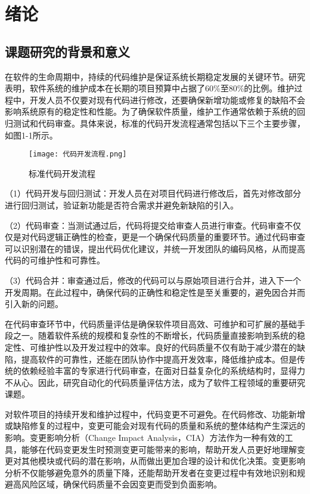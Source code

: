 
\chapter{绪论}

\section{课题研究的背景和意义}

在软件的生命周期中，持续的代码维护是保证系统长期稳定发展的关键环节。研究表明，软件系统的维护成本在长期的项目预算中占据了60\%至80\%的比例\cite{2012Maintenance}。维护过程中，开发人员不仅要对现有代码进行修改，还要确保新增功能或修复的缺陷不会影响系统原有的稳定性和性能。为了确保软件质量，维护工作通常依赖于系统的回归测试和代码审查。具体来说，标准的代码开发流程通常包括以下三个主要步骤，如图1-1所示。

\begin{figure}[h]
\centering
\texttt{[image: 代码开发流程.png]}
\caption{标准代码开发流程}
\end{figure}

（1）代码开发与回归测试：开发人员在对项目代码进行修改后，首先对修改部分进行回归测试，验证新功能是否符合需求并避免新缺陷的引入。

（2）代码审查：当测试通过后，代码将提交给审查人员进行审查。代码审查不仅仅是对代码逻辑正确性的检查，更是一个确保代码质量的重要环节。通过代码审查可以识别潜在的错误，提出代码优化建议，并统一开发团队的编码风格，从而提高代码的可维护性和可靠性。

（3）代码合并：审查通过后，修改的代码可以与原始项目进行合并，进入下一个开发周期。在此过程中，确保代码的正确性和稳定性是至关重要的，避免因合并而引入新的问题。

在代码审查环节中，代码质量评估是确保软件项目高效、可维护和可扩展的基础手段之一。随着软件系统的规模和复杂性的不断增长，代码质量直接影响到系统的稳定性、可维护性以及开发过程中的效率。良好的代码质量不仅有助于减少潜在的缺陷，提高软件的可靠性，还能在团队协作中提高开发效率，降低维护成本。但是传统的依赖经验丰富的专家进行代码审查，在面对日益复杂化的系统结构时，显得力不从心\cite{2016Microservices}。因此，研究自动化的代码质量评估方法，成为了软件工程领域的重要研究课题。

对软件项目的持续开发和维护过程中，代码变更不可避免。在代码修改、功能新增或缺陷修复的过程中，变更可能会对现有代码的质量和系统的整体结构产生深远的影响。变更影响分析（Change Impact Analysis，CIA）方法作为一种有效的工具，能够在代码变更发生时预测变更可能带来的影响，帮助开发人员更好地理解变更对其他模块或代码的潜在影响，从而做出更加合理的设计和优化决策。变更影响分析不仅能够避免意外的质量下降，还能帮助开发者在变更过程中有效地识别和规避高风险区域，确保代码质量不会因变更而受到负面影响。

